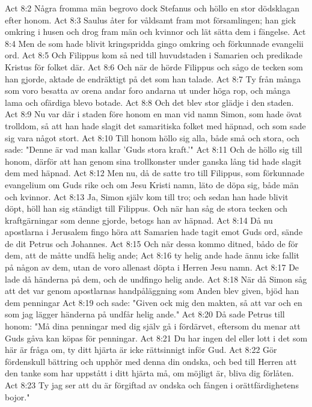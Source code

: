 Act 8:2  Några fromma män begrovo dock Stefanus och höllo en stor dödsklagan efter honom.
Act 8:3  Saulus åter for våldsamt fram mot församlingen; han gick omkring i husen och drog fram män och kvinnor och lät sätta dem i fängelse.
Act 8:4  Men de som hade blivit kringspridda gingo omkring och förkunnade evangelii ord.
Act 8:5  Och Filippus kom så ned till huvudstaden i Samarien och predikade Kristus för folket där.
Act 8:6  Och när de hörde Filippus och sågo de tecken som han gjorde, aktade de endräktigt på det som han talade.
Act 8:7  Ty från många som voro besatta av orena andar foro andarna ut under höga rop, och många lama och ofärdiga blevo botade.
Act 8:8  Och det blev stor glädje i den staden.
Act 8:9  Nu var där i staden före honom en man vid namn Simon, som hade övat trolldom, så att han hade slagit det samaritiska folket med häpnad, och som sade sig vara något stort.
Act 8:10  Till honom höllo sig alla, både små och stora, och sade: "Denne är vad man kallar 'Guds stora kraft.'"
Act 8:11  Och de höllo sig till honom, därför att han genom sina trollkonster under ganska lång tid hade slagit dem med häpnad.
Act 8:12  Men nu, då de satte tro till Filippus, som förkunnade evangelium om Guds rike och om Jesu Kristi namn, läto de döpa sig, både män och kvinnor.
Act 8:13  Ja, Simon själv kom till tro; och sedan han hade blivit döpt, höll han sig ständigt till Filippus. Och när han såg de stora tecken och kraftgärningar som denne gjorde, betogs han av häpnad.
Act 8:14  Då nu apostlarna i Jerusalem fingo höra att Samarien hade tagit emot Guds ord, sände de dit Petrus och Johannes.
Act 8:15  Och när dessa kommo ditned, bådo de för dem, att de måtte undfå helig ande;
Act 8:16  ty helig ande hade ännu icke fallit på någon av dem, utan de voro allenast döpta i Herren Jesu namn.
Act 8:17  De lade då händerna på dem, och de undfingo helig ande.
Act 8:18  När då Simon såg att det var genom apostlarnas handpåläggning som Anden blev given, bjöd han dem penningar
Act 8:19  och sade: "Given ock mig den makten, så att var och en som jag lägger händerna på undfår helig ande."
Act 8:20  Då sade Petrus till honom: "Må dina penningar med dig själv gå i fördärvet, eftersom du menar att Guds gåva kan köpas för penningar.
Act 8:21  Du har ingen del eller lott i det som här är fråga om, ty ditt hjärta är icke rättsinnigt inför Gud.
Act 8:22  Gör fördenskull bättring och upphör med denna din ondska, och bed till Herren att den tanke som har uppstått i ditt hjärta må, om möjligt är, bliva dig förlåten.
Act 8:23  Ty jag ser att du är förgiftad av ondska och fången i orättfärdighetens bojor."
